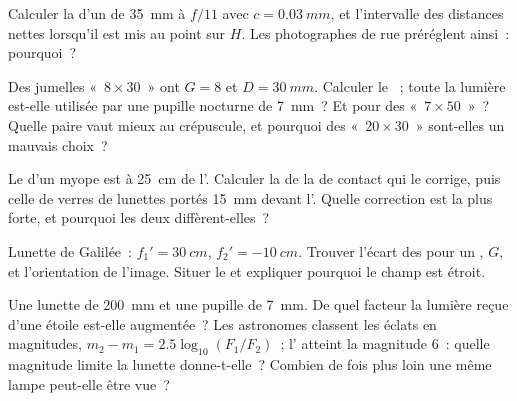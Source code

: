 \begin{exercise}[$\star\star$]\label{exo:b1:optical-instruments:8}
Calculer la  d'un  de \qty{35}{mm} à $f/11$
avec $c = \qty{0.03}{mm}$, et l'intervalle des distances nettes lorsqu'il
est mis au point sur $H$. Les photographes de rue préréglent ainsi~:
pourquoi~?
\end{exercise}

\begin{exercise}[$\star\star$]\label{exo:b1:optical-instruments:9}
Des jumelles «~$8\times30$~» ont $G = 8$ et $D = \qty{30}{mm}$. Calculer
le ~; toute la lumière est-elle utilisée par une pupille
nocturne de \qty{7}{mm}~? Et pour des «~$7\times50$~»~? Quelle paire
vaut mieux au crépuscule, et pourquoi des «~$20\times30$~» sont-elles un
mauvais choix~?
\end{exercise}

\begin{exercise}[$\star\star\star$]\label{exo:b1:optical-instruments:10}
Le  d'un myope est à \qty{25}{cm} de l'. Calculer la
 de la  de contact qui le corrige, puis celle de verres
de lunettes portés \qty{15}{mm} devant l'. Quelle correction est la
plus forte, et pourquoi les deux diffèrent-elles~?
\end{exercise}

\begin{exercise}[$\star\star\star$]\label{exo:b1:optical-instruments:11}
Lunette de Galilée~: $f_1' = \qty{30}{cm}$, $f_2' = \qty{-10}{cm}$.
Trouver l'écart des  pour un , $G$, et
l'orientation de l'image. Situer le  et expliquer
pourquoi le champ est étroit.
\end{exercise}

\begin{exercise}[$\star\star\star$]\label{exo:b1:optical-instruments:12}
Une lunette de \qty{200}{mm} et une pupille de \qty{7}{mm}. De quel
facteur la lumière reçue d'une étoile est-elle augmentée~? Les
astronomes classent les éclats en magnitudes,
$m_2 - m_1 = 2.5\log_{10}(F_1/F_2)$~; l' atteint la magnitude $6$~:
quelle magnitude limite la lunette donne-t-elle~? Combien de fois plus
loin une même lampe peut-elle être vue~?
\end{exercise}

